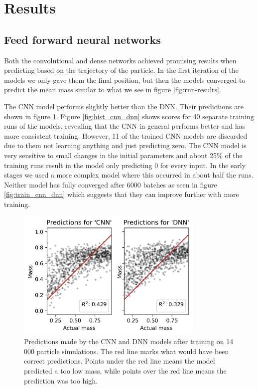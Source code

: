 \documentclass[a4paper]{article}
\begin{document}
\section{Results}

\subsection{Feed forward neural networks}
Both the convolutional and dense networks achieved promising results when predicting based on the trajectory of the particle. In the first iteration of the models we only gave them the final position, but then the models converged to predict the mean mass similar to what we see in figure \ref{fig:rnn-results}.

The CNN model performs slightly better than the DNN. Their predictions are shown in figure \ref{fig:pred_cnn_dnn}. Figure \ref{fig:hist_cnn_dnn} shows scores for 40 separate training runs of the models, revealing that the CNN in general performs better and has more consistent training. However, 11 of the trained CNN models are discarded due to them not learning anything and just predicting zero. The CNN model is very sensitive to small changes in the initial parameters and about 25\% of the training runs result in the model only predicting 0 for every input. In the early stages we used a more complex model where this occurred in about half the runs. Neither model has fully converged after 6000 batches as seen in figure \ref{fig:train_cnn_dnn} which suggests that they can improve further with more training.

\begin{figure}
    \centering
    \includegraphics[width=0.8\textwidth]{Figures/predictions_cnn_dnn.png}
    \caption{Predictions made by the CNN and DNN models after training on 14 000 particle simulations. The red line marks what would have been correct predictions. Points under the red line means the model predicted a too low mass, while points over the red line means the prediction was too high.}
    \label{fig:pred_cnn_dnn}
\end{figure}
\end{document}
